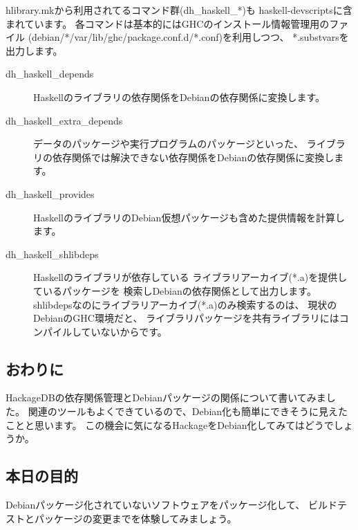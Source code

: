 \documentclass[mingoth,a4paper]{jsarticle}
\begin{document}
hlibrary.mkから利用されてるコマンド群(dh\_haskell\_*)も
haskell-devscriptsに含まれています。
各コマンドは基本的にはGHCのインストール情報管理用のファイル
(debian/*/var/lib/ghc/package.conf.d/*.conf)を利用しつつ、
*.substvarsを出力します。

\begin{description}
\item[dh\_haskell\_depends]
Haskellのライブラリの依存関係をDebianの依存関係に変換します。
\item[dh\_haskell\_extra\_depends]
データのパッケージや実行プログラムのパッケージといった、
ライブラリの依存関係では解決できない依存関係をDebianの依存関係に変換します。
\item[dh\_haskell\_provides]
HaskellのライブラリのDebian仮想パッケージも含めた提供情報を計算します。
\item[dh\_haskell\_shlibdeps]
Haskellのライブラリが依存している
ライブラリアーカイブ(*.a)を提供しているパッケージを
検索しDebianの依存関係として出力します。
shlibdepsなのにライブラリアーカイブ(*.a)のみ検索するのは、
現状のDebianのGHC環境だと、
ライブラリパッケージを共有ライブラリにはコンパイルしていないからです。
\end{description}

\subsection{おわりに}

HackageDBの依存関係管理とDebianパッケージの関係について書いてみました。
関連のツールもよくできているので、Debian化も簡単にできそうに見えたことと思います。
この機会に気になるHackageをDebian化してみてはどうでしょうか。


\subsection{本日の目的}

Debianパッケージ化されていないソフトウェアをパッケージ化して、
ビルドテストとパッケージの変更までを体験してみましょう。
\end{document}
